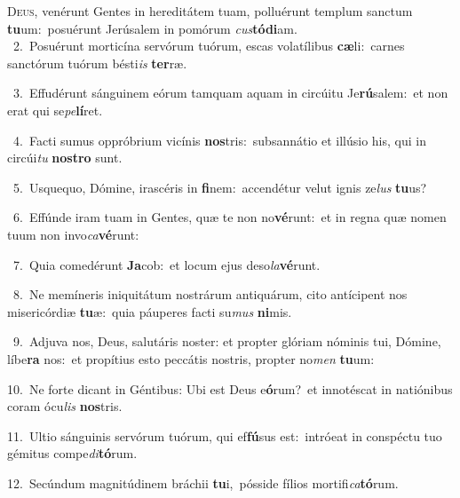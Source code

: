\lettrine{\initial\textcolor{\initialcolor}{D}}{eus,} venérunt Gentes in hereditátem tuam, polluérunt templum sanctum \textbf{tu}\-um:~\star posuérunt Jerúsalem in pomórum \textit{cus}\-\textbf{tó}\textbf{di}am.\\
{\numbfont\textcolor{\numbcolor}{~2.}}~Posuérunt morticína servórum tuórum, escas volatílibus \textbf{cæ}\-li:~\star carnes sanctórum tuórum bésti\textit{is} \textbf{ter}\-ræ.\par
{\numbfont\textcolor{\numbcolor}{~3.}}~Effudérunt sánguinem eórum tamquam aquam in circúitu Je\-\textbf{rú}\-salem:~\star et non erat qui se\-\textit{pe}\-\textbf{lí}ret.\par
{\numbfont\textcolor{\numbcolor}{~4.}}~Facti sumus oppróbrium vicínis \textbf{nos}\-tris:~\star subsannátio et illúsio his, qui in circúi\textit{tu} \textbf{nos}\-\textbf{tro} sunt.\par
{\numbfont\textcolor{\numbcolor}{~5.}}~Usquequo, Dómine, irascéris in \textbf{fi}\-nem:~\star accendétur velut ignis ze\textit{lus} \textbf{tu}\-us?\par
{\numbfont\textcolor{\numbcolor}{~6.}}~Effúnde iram tuam in Gentes, quæ te non no\-\textbf{vé}\-runt:~\star et in regna quæ nomen tuum non invo\-\textit{ca}\-\textbf{vé}runt:\par
{\numbfont\textcolor{\numbcolor}{~7.}}~Quia comedérunt \textbf{Ja}\-cob:~\star et locum ejus deso\-\textit{la}\-\textbf{vé}runt.\par
{\numbfont\textcolor{\numbcolor}{~8.}}~Ne memíneris iniquitátum nostrárum antiquárum, cito antícipent nos misericórdiæ \textbf{tu}\-æ:~\star quia páuperes facti su\textit{mus} \textbf{ni}\-mis.\par
{\numbfont\textcolor{\numbcolor}{~9.}}~Adjuva nos, Deus, salutáris noster: et propter glóriam nóminis tui, Dómine, líbe\textbf{ra} nos:~\star et propítius esto peccátis nostris, propter no\textit{men} \textbf{tu}\-um:\par
{\numbfont\textcolor{\numbcolor}{10.}}~Ne forte dicant in Géntibus: Ubi est Deus e\-\textbf{ó}\-rum?~\star et innotéscat in natiónibus coram ócu\textit{lis} \textbf{nos}\-tris.\par
{\numbfont\textcolor{\numbcolor}{11.}}~Ultio sánguinis servórum tuórum, qui ef\-\textbf{fú}\-sus est:~\star intróeat in conspéctu tuo gémitus compe\-\textit{di}\-\textbf{tó}rum.\par
{\numbfont\textcolor{\numbcolor}{12.}}~Secúndum magnitúdinem bráchii \textbf{tu}\-i,~\star pósside fílios mortifi\-\textit{ca}\-\textbf{tó}rum.\par
